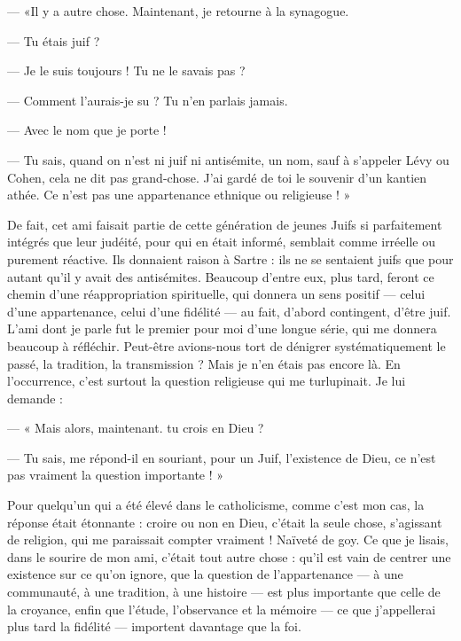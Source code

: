 {— «Il y a autre chose. Maintenant, je retourne à la synagogue.

— Tu étais juif ?

— Je le suis toujours ! Tu ne le savais pas ?

— Comment l’aurais-je su ? Tu n’en parlais jamais.

— Avec le nom que je porte !

— Tu sais, quand on n’est ni juif ni antisémite, un nom, sauf à s'appeler
Lévy ou Cohen, cela ne dit pas grand-chose. J'ai gardé de toi le souvenir d’un
kantien athée. Ce n’est pas une appartenance ethnique ou religieuse ! »

De fait, cet ami faisait partie de cette génération de jeunes Juifs si parfaitement
intégrés que leur judéité, pour qui en était informé, semblait comme
irréelle ou purement réactive. Ils donnaient raison à Sartre : ils ne se sentaient
juifs que pour autant qu’il y avait des antisémites. Beaucoup d’entre eux, plus
tard, feront ce chemin d’une réappropriation spirituelle, qui donnera un sens
positif — celui d’une appartenance, celui d’une fidélité — au fait, d’abord contingent,
d’être juif. L’ami dont je parle fut le premier pour moi d’une longue série,
qui me donnera beaucoup à réfléchir. Peut-être avions-nous tort de dénigrer
systématiquement le passé, la tradition, la transmission ? Mais je n’en étais pas
encore là. En l'occurrence, c’est surtout la question religieuse qui me turlupinait.
Je lui demande :

— « Mais alors, maintenant. tu crois en Dieu ?

— Tu sais, me répond-il en souriant, pour un Juif, l'existence de Dieu, ce
n’est pas vraiment la question importante ! »

Pour quelqu'un qui a été élevé dans le catholicisme, comme c’est mon
cas, la réponse était étonnante : croire ou non en Dieu, c'était la seule chose,
s'agissant de religion, qui me paraissait compter vraiment ! Naïveté de goy.
Ce que je lisais, dans le sourire de mon ami, c’était tout autre chose : qu’il est
vain de centrer une existence sur ce qu’on ignore, que la question de l’appartenance
— à une communauté, à une tradition, à une histoire — est plus
importante que celle de la croyance, enfin que l'étude, l’observance et la
mémoire — ce que j’appellerai plus tard la fidélité — importent davantage que
la foi.

}
